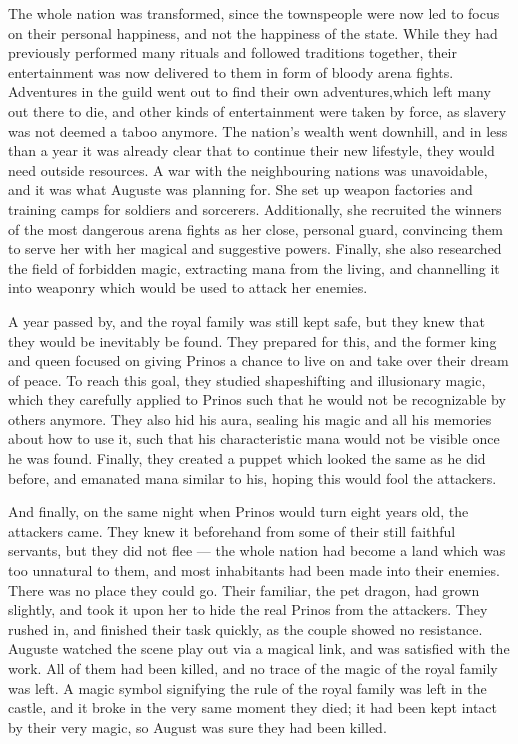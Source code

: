 \froufrou{}

The whole nation was transformed, since the townspeople were now led to focus on their personal happiness, and not the happiness of the state. While they had previously performed many rituals and followed traditions together, their entertainment was now delivered to them in form of bloody arena fights. Adventures in the guild went out to find their own adventures,which left many out there to die, and other kinds of entertainment were taken by force, as slavery was not deemed a taboo anymore. The nation's wealth went downhill, and in less than a year it was already clear that to continue their new lifestyle, they would need outside resources. A war with the neighbouring nations was unavoidable, and it was what Auguste was planning for. She set up weapon factories and training camps for soldiers and sorcerers. Additionally, she recruited the winners of the most dangerous arena fights as her close, personal guard, convincing them to serve her with her magical and suggestive powers. Finally, she also researched the field of forbidden magic, extracting mana from the living, and channelling it into weaponry which would be used to attack her enemies.

A year passed by, and the royal family was still kept safe, but they knew that they would be inevitably be found. They prepared for this, and the former king and queen focused on giving Prinos a chance to live on and take over their dream of peace. To reach this goal, they studied shapeshifting and illusionary magic, which they carefully applied to Prinos such that he would not be recognizable by others anymore. They also hid his aura, sealing his magic and all his memories about how to use it, such that his characteristic mana would not be visible once he was found. Finally, they created a puppet which looked the same as he did before, and emanated mana similar to his, hoping this would fool the attackers.

And finally, on the same night when Prinos would turn eight years old, the attackers came. They knew it beforehand from some of their still faithful servants, but they did not flee --- the whole nation had become a land which was too unnatural to them, and most inhabitants had been made into their enemies. There was no place they could go. Their familiar, the pet dragon, had grown slightly, and took it upon her to hide the real Prinos from the attackers. They rushed in, and finished their task quickly, as the couple showed no resistance. Auguste watched the scene play out via a magical link, and was satisfied with the work. All of them had been killed, and no trace of the magic of the royal family was left. A magic symbol signifying the rule of the royal family was left in the castle, and it broke in the very same moment they died; it had been kept intact by their very magic, so August was sure they had been killed.

